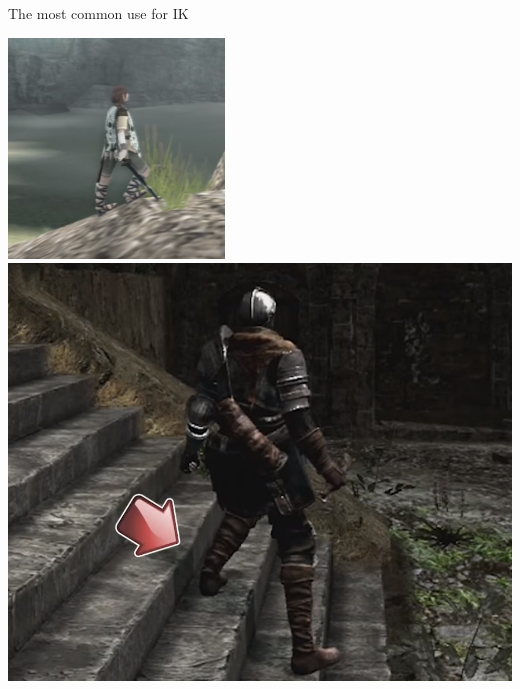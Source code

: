 \begin{frame}{The most common use for IK}
\begin{center}
		\pause\includegraphics[height=0.4\textheight]{ik_feet4} \quad
		\pause\includegraphics[height=0.4\textheight]{ik_feet}
	\end{center}
\end{frame}

